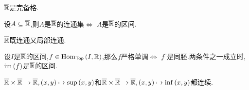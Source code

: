\begin{proposition}{}{}
	$\overline{\mathbb{R}}$是完备格.
\end{proposition}

\begin{proposition}{}{}
	设$A\subseteq\overline{\mathbb{R}}$,则$A$是$\overline{\mathbb{R}}$的连通集$\iff$ $A$是$\overline{\mathbb{R}}$的区间.
\end{proposition}

\begin{corollary}{}{}
	$\overline{\mathbb{R}}$既连通又局部连通.
\end{corollary}

\begin{proposition}{}{}
	设$I$是$\overline{\mathbb{R}}$的区间,$f\in\operatorname{Hom}_{\mathsf{Top}}\left(I,\mathbb{R}\right)$,那么$f$严格单调$\iff$ $f^{\circ}$是同胚.两条件之一成立时,$\operatorname{im}\left(f\right)$是$\overline{\mathbb{R}}$的区间.
\end{proposition}

\begin{proposition}{}{}
	$\overline{\mathbb{R}}\times\overline{\mathbb{R}}\to\overline{\mathbb{R}},\left(x,y\right)\mapsto\sup\left(x,y\right)$和$\overline{\mathbb{R}}\times\overline{\mathbb{R}}\to\overline{\mathbb{R}},\left(x,y\right)\mapsto\inf\left(x,y\right)$都连续.
\end{proposition}